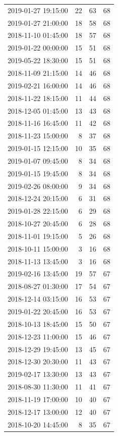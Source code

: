 \begin{tabular}{lrrr}
2019-01-27 19:15:00 & 22 & 63 & 68 \\
2019-01-27 21:00:00 & 18 & 58 & 68 \\
2018-11-10 01:45:00 & 18 & 57 & 68 \\
2019-01-22 00:00:00 & 15 & 51 & 68 \\
2019-05-22 18:30:00 & 15 & 51 & 68 \\
2018-11-09 21:15:00 & 14 & 46 & 68 \\
2019-02-21 16:00:00 & 14 & 46 & 68 \\
2018-11-22 18:15:00 & 11 & 44 & 68 \\
2018-12-05 01:45:00 & 13 & 43 & 68 \\
2018-11-16 16:45:00 & 11 & 42 & 68 \\
2018-11-23 15:00:00 & 8 & 37 & 68 \\
2019-01-15 12:15:00 & 10 & 35 & 68 \\
2019-01-07 09:45:00 & 8 & 34 & 68 \\
2019-01-15 19:45:00 & 8 & 34 & 68 \\
2019-02-26 08:00:00 & 9 & 34 & 68 \\
2018-12-24 20:15:00 & 6 & 31 & 68 \\
2019-01-28 22:15:00 & 6 & 29 & 68 \\
2018-10-27 20:45:00 & 6 & 28 & 68 \\
2018-11-01 19:15:00 & 5 & 26 & 68 \\
2018-10-11 15:00:00 & 3 & 16 & 68 \\
2018-11-13 13:45:00 & 3 & 16 & 68 \\
2019-02-16 13:45:00 & 19 & 57 & 67 \\
2018-08-27 01:30:00 & 17 & 54 & 67 \\
2018-12-14 03:15:00 & 16 & 53 & 67 \\
2019-01-22 20:45:00 & 16 & 53 & 67 \\
2018-10-13 18:45:00 & 15 & 50 & 67 \\
2018-12-23 11:00:00 & 15 & 46 & 67 \\
2018-12-29 19:45:00 & 13 & 45 & 67 \\
2018-12-30 20:30:00 & 11 & 43 & 67 \\
2019-02-17 13:30:00 & 13 & 43 & 67 \\
2018-08-30 11:30:00 & 11 & 41 & 67 \\
2018-11-19 17:00:00 & 10 & 40 & 67 \\
2018-12-17 13:00:00 & 12 & 40 & 67 \\
2018-10-20 14:45:00 & 8 & 35 & 67 \\

\end{tabular}
